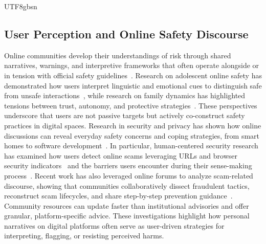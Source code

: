 \documentclass[sigconf,nonacm]{acmart}
\newcommand{\rev}[1]{#1}
\newcommand{\add}[1]{#1}
\begin{document}
\begin{CJK}{UTF8}{gbsn}
\subsection{\rev{User Perception and Online Safety Discourse}}


Online communities develop their understandings of risk through shared narratives, warnings, and interpretive frameworks that often operate alongside or in tension with official safety guidelines~\cite{kou17Conspiracy, nagar2012collective, wei2024understanding}. Research on adolescent online safety has demonstrated how users interpret linguistic and emotional cues to distinguish safe from unsafe interactions~\cite{ali2022understanding}, while research on family dynamics has highlighted tensions between trust, autonomy, and protective strategies~\cite{hartikainen2016discourses}. These perspectives underscore that users are not passive targets but actively co-construct safety practices in digital spaces. Research in security and privacy has shown how online discussions can reveal everyday safety concerns and coping strategies, from smart homes to software development~\cite{vafa-sp25, ali-sp25, li-sp23, bellini2021so, li2021developers, tahaei2020understanding, whiting2019online}. \add{In particular, human-centered security research has examined how users detect online scams leveraging URLs and browser security indicators~\cite{dhamija2006phishing, sheng2010phish, egelman2008youve, sunshine2009crying} and the barriers users encounter during their sense-making process~\cite{downs2007behavioral, wash2020experts, nthala2021nonexperts}. Recent work has also leveraged online forums to analyze scam-related discourse, showing that communities collaboratively dissect fraudulent tactics, reconstruct scam lifecycles, and share step-by-step prevention guidance~\cite{oak2025discourse}. Community resources can update faster than institutional advisories and offer granular, platform-specific advice.} These investigations highlight how personal narratives on digital platforms often serve as user-driven strategies for interpreting, flagging, or resisting perceived harms.


\end{CJK}
\end{document}
